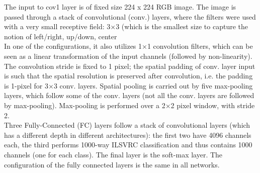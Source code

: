 The input to cov1 layer is of fixed size 224 x 224 RGB image. The image is passed through a stack of convolutional (conv.) layers, where the filters were used with a very small receptive field: 3×3 (which is the smallest size to capture the notion of left/right, up/down, center\\
 In one of the configurations, it also utilizes 1×1 convolution filters, which can be seen as a linear transformation of the input channels (followed by non-linearity). The convolution stride is fixed to 1 pixel; the spatial padding of conv. layer input is such that the spatial resolution is preserved after convolution, i.e. the padding is 1-pixel for 3×3 conv. layers. Spatial pooling is carried out by five max-pooling layers, which follow some of the conv.  layers (not all the conv. layers are followed by max-pooling). Max-pooling is performed over a 2×2 pixel window, with stride 2.\\
Three Fully-Connected (FC) layers follow a stack of convolutional layers (which has a different depth in different architectures): the first two have 4096 channels each, the third performs 1000-way ILSVRC classification and thus contains 1000 channels (one for each class). The final layer is the soft-max layer. The configuration of the fully connected layers is the same in all networks.

